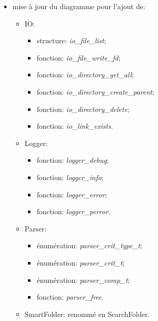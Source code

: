 \documentclass[11pt, a4paper]{article}
\begin{document}
\begin{itemize}
    \item mise à jour du diagramme pour l'ajout de:
    \begin{itemize}
        \item IO:
        \begin{itemize}
            \item structure: \textit{io\_file\_list};
            \item fonction: \textit{io\_file\_write\_fd};
            \item fonction: \textit{io\_directory\_get\_all};
            \item fonction: \textit{io\_directory\_create\_parent};
            \item fonction: \textit{io\_directory\_delete};
            \item fonction: \textit{io\_link\_exists}.
        \end{itemize}
    \end{itemize}
    \begin{itemize}
        \item Logger:
        \begin{itemize}
            \item fonction: \textit{logger\_debug};
            \item fonction: \textit{logger\_info};
            \item fonction: \textit{logger\_error};
            \item fonction: \textit{logger\_perror}.
        \end{itemize}
    \end{itemize}
    \begin{itemize}
        \item Parser:
        \begin{itemize}
            \item énumération: \textit{parser\_crit\_type\_t};
            \item énumération: \textit{parser\_crit\_t};
            \item énumération: \textit{parser\_comp\_t};
            \item fonction: \textit{parser\_free}.
        \end{itemize}
    \end{itemize}
    \begin{itemize}
        \item SmartFolder: renommé en SearchFolder.
    \end{itemize}

\end{itemize}
\end{document}
